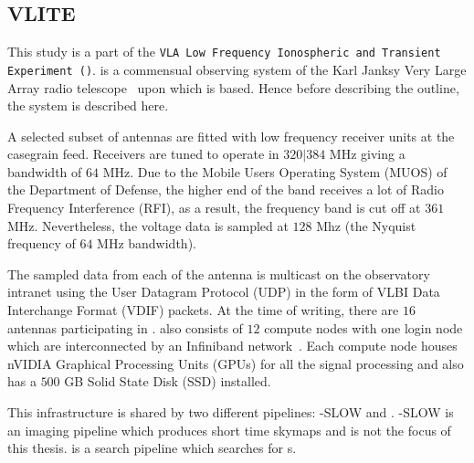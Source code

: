 \subsection{VLITE}

\par This study is a part of the \texttt{VLA Low Frequency Ionospheric and Transient Experiment (\vlite)}. 
\vlite is a commensual observing system of the Karl Janksy Very Large Array radio telescope~\cite{vla} upon which \vf is based. 
Hence before describing the outline, the \vlite system is described here.

\par A selected subset of \vla antennas are fitted with low frequency receiver units at the casegrain feed. 
Receivers are tuned to operate in $320|384$ MHz giving a bandwidth of $64$ MHz. Due to the Mobile Users Operating System (MUOS) of the Department of Defense, the higher end of the band receives a lot of Radio Frequency Interference (RFI), as a result, the frequency band is cut off at $361$ MHz. Nevertheless, the voltage data is sampled at $128$ Mhz (the Nyquist frequency of $64$ MHz bandwidth).
\par The sampled data from each of the antenna is multicast on the observatory intranet using the User Datagram Protocol (UDP) in the form of VLBI Data Interchange Format (VDIF) packets. At the time of writing, there are $16$ \vla antennas participating in \vlite. \vlite also consists of $12$ compute nodes with one login node which are interconnected by an Infiniband network~\cite{infiniband}. 
Each compute node houses nVIDIA Graphical Processing Units (GPUs) for all the signal processing and also has a $500$ GB Solid State Disk (SSD) installed.

\par This infrastructure is shared by two different pipelines: \vlite-SLOW and \vf. \vlite-SLOW is an imaging pipeline which produces short time skymaps and is not the focus of this thesis. \vf is a search pipeline which searches for \frb{}s.

